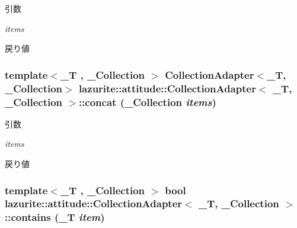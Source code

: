 \begin{DoxyParams}{引数}
\item[{\em items}]\end{DoxyParams}
\begin{DoxyReturn}{戻り値}

\end{DoxyReturn}
\hypertarget{classlazurite_1_1attitude_1_1_collection_adapter_3_01___t_00_01___collection_01_4_a918c545b4a308f24bc15c42fbfe10d9a}{
\subsubsection[{concat}]{\setlength{\rightskip}{0pt plus 5cm}template$<$\_\-T , \_\-Collection $>$ CollectionAdapter$<$\_\-T, \_\-Collection$>$ lazurite::attitude::CollectionAdapter$<$ \_\-T, \_\-Collection $>$::concat (\_\-Collection {\em items})}}
\label{classlazurite_1_1attitude_1_1_collection_adapter_3_01___t_00_01___collection_01_4_a918c545b4a308f24bc15c42fbfe10d9a}

\begin{DoxyParams}{引数}
\item[{\em items}]\end{DoxyParams}
\begin{DoxyReturn}{戻り値}

\end{DoxyReturn}
\hypertarget{classlazurite_1_1attitude_1_1_collection_adapter_3_01___t_00_01___collection_01_4_a4d1b63c2ba73439576582cfbbd32629c}{
\subsubsection[{contains}]{\setlength{\rightskip}{0pt plus 5cm}template$<$\_\-T , \_\-Collection $>$ bool lazurite::attitude::CollectionAdapter$<$ \_\-T, \_\-Collection $>$::contains (\_\-T {\em item})}}
\label{classlazurite_1_1attitude_1_1_collection_adapter_3_01___t_00_01___collection_01_4_a4d1b63c2ba73439576582cfbbd32629c}

